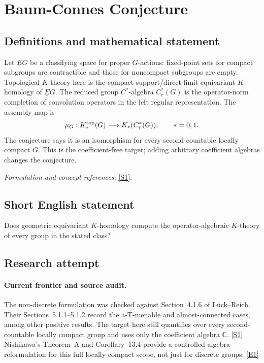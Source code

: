 \documentclass[11pt]{article}
\newcommand{\C}{\mathbb{C}}
\newcommand{\sref}[2]{\hyperlink{source:#1:#2}{[S#2]}}
\newcommand{\eref}[2]{\hyperlink{extra:#1:#2}{[E#2]}}
\newif\ifshowcatalogue
\newcommand{\cataloguescope}[1]{\ifshowcatalogue
 \paragraph{Exact scope in the supplied catalogue.}
 \begin{quote}\small #1\end{quote}\fi}
\begin{document}
\setcounter{section}{0}
\clearpage
\section*{\texorpdfstring{Baum-Connes Conjecture}{Baum-Connes Conjecture}}\label{1479}
\subsection{Definitions and mathematical statement}
Let $\underline EG$ be a classifying space for proper $G$-actions: fixed-point sets for compact subgroups are contractible and those for noncompact subgroups are empty. Topological $K$-theory here is the compact-support/direct-limit equivariant $K$-homology of $\underline EG$. The reduced group $C^*$-algebra $C_r^*(G)$ is the operator-norm completion of convolution operators in the left regular representation. The assembly map is
\[
 \mu_G:K_*^{\rm top}(G)\longrightarrow K_*(C_r^*(G)),\qquad *=0,1.
\]
The conjecture says it is an isomorphism for every second-countable locally compact $G$. This is the coefficient-free target; adding arbitrary coefficient algebras changes the conjecture.
\par\smallskip\textit{Formulation and concept references:} \sref{1479}{1}.
\cataloguescope{Prove the Baum-Connes conjecture for every second-countable locally compact group G: the assembly map K\_top(G) \ensuremath{\to} K(C*\_r(G)) from the topological K-theory of the group, built from the classifying space for proper actions, to the K-theory of the reduced group C*-algebra is an isomorphism.}
\subsection{Short English statement}
Does geometric equivariant $K$-homology compute the operator-algebraic $K$-theory of every group in the stated class?
\subsection{Research attempt}

\paragraph{Current frontier and source audit.}
The non-discrete formulation was checked against Section~4.1.6 of
L\"uck--Reich. Their Sections~5.1.1--5.1.2 record the a-T-menable and
almost-connected cases, among other positive results. The target here
still quantifies over every second-countable locally compact group and
uses only the coefficient algebra $\C$. \sref{1479}{1}
Nishikawa's Theorem~A and Corollary~13.4 provide a controlled-algebra
reformulation for this full locally compact scope, not just for discrete
groups. \eref{1479}{1}
\end{document}
